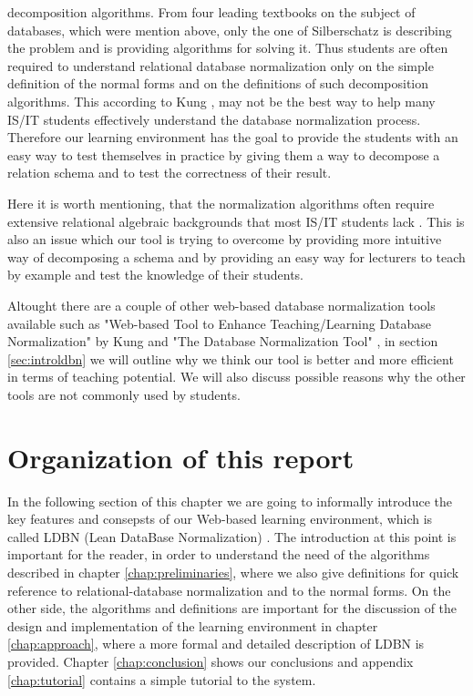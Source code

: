decomposition algorithms. From four leading textbooks on the subject of 
databases, which were mention above, only the one of Silberschatz \cite{bdb4}
is describing the problem and is providing algorithms for solving it. Thus students 
are often required to understand relational database normalization only on the 
simple definition of the normal forms and on the definitions of such decomposition
algorithms. This according to Kung \cite{p8}, may not be the best way to help many 
IS/IT students effectively understand the database normalization process. Therefore
our learning environment has the goal to provide the students with an easy way to test themselves
in practice by giving them a way to decompose a relation schema and to 
test the correctness of their result. 

Here it is worth mentioning, that the normalization algorithms often require 
extensive relational algebraic backgrounds that most IS/IT students lack \cite{p8}. This
is also an issue which our tool is trying to overcome by providing more intuitive 
way of decomposing a schema and by providing an easy way for lecturers to
teach by example and test the knowledge of their students. 

Altought there are a couple of other web-based database normalization tools 
available such as "Web-based Tool to Enhance Teaching/Learning Database 
Normalization" by Kung \cite{p8} and "The Database Normalization Tool" \cite{w1}, 
in section \ref{sec:introldbn} we will outline why we think our tool is better 
and more efficient
in terms of teaching potential. We will also discuss possible reasons why the 
other tools are not commonly used by students. 

\section{Organization of this report}
\label{sec:organization}
In the following section of this chapter we are going to informally introduce 
the key features and consepsts of our Web-based learning environment, 
which is called LDBN (Lean DataBase Normalization) \cite{wldbn}. 
The introduction at this point is important for the reader,
in order to understand the need of the algorithms described in chapter 
\ref{chap:preliminaries}, where we also give definitions for quick reference to
relational-database normalization and to the normal forms. On the other side, 
the algorithms and definitions are important for the discussion of the design and 
implementation of the learning environment in chapter \ref{chap:approach}, 
where a more formal and detailed description of LDBN is provided. Chapter 
\ref{chap:conclusion} shows our conclusions and appendix \ref{chap:tutorial} contains a simple 
tutorial to the system.


